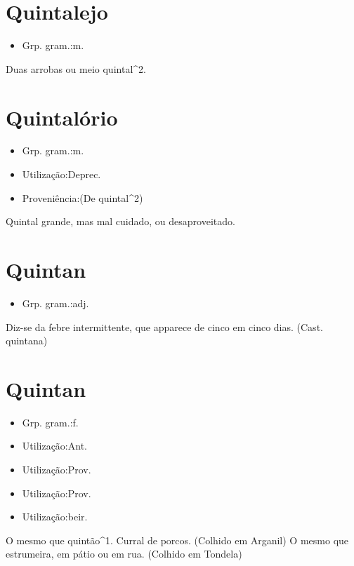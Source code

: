 \section{Quintalejo}
\begin{itemize}
\item {Grp. gram.:m.}
\end{itemize}
Duas arrobas ou meio quintal^2.
\section{Quintalório}
\begin{itemize}
\item {Grp. gram.:m.}
\end{itemize}
\begin{itemize}
\item {Utilização:Deprec.}
\end{itemize}
\begin{itemize}
\item {Proveniência:(De \textunderscore quintal\textunderscore ^2)}
\end{itemize}
Quintal grande, mas mal cuidado, ou desaproveitado.
\section{Quintan}
\begin{itemize}
\item {Grp. gram.:adj.}
\end{itemize}
Diz-se da febre intermittente, que apparece de cinco em cinco dias.
(Cast. \textunderscore quintana\textunderscore )
\section{Quintan}
\begin{itemize}
\item {Grp. gram.:f.}
\end{itemize}
\begin{itemize}
\item {Utilização:Ant.}
\end{itemize}
\begin{itemize}
\item {Utilização:Prov.}
\end{itemize}
\begin{itemize}
\item {Utilização:Prov.}
\end{itemize}
\begin{itemize}
\item {Utilização:beir.}
\end{itemize}
O mesmo que \textunderscore quintão\textunderscore ^1.
Curral de porcos. (Colhido em Arganil)
O mesmo que \textunderscore estrumeira\textunderscore , em pátio ou em rua. (Colhido em Tondela)
